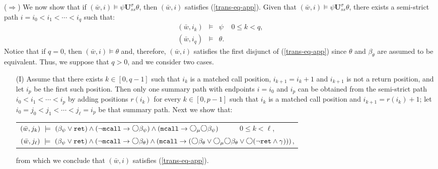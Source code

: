 \documentclass{LMCS}
\newcommand{\M}{{\mu}}
\newcommand{\w}{{\bar{w}}}
\newcommand{\dm}{\Diamond}
\newcommand{\U}{{\mathbf U}}
\newcommand{\next}{\text{\raisebox{1pt}{$\bigcirc$}}}
\theoremstyle{plain}
\theoremstyle{definition}
\newcommand{\ppath}{\sigma} \newcommand{\Ul}{\U}
\newcommand{\Up}{\U^\ppath}
\newcommand{\Uss}{\Up_{ss}}
\newcommand{\mcall}{{\tt{mcall}}}
\newcommand{\rett}{{\tt ret}}
\newcommand{\dmm}{\dm_{\M}}
\renewcommand{\dm}{\next}
\renewcommand{\dmm}{\dm_\M}
\begin{document}
\noindent
($\Rightarrow$) We now show that if $(\w, i) \models \psi \Uss
\theta$, then  $(\w, i)$ satisfies (\ref{trans-eq-app}). Given that $(\w,
i) \models \psi \Uss \theta$, there exists a semi-strict path
$i = i_0 < i_1 < \cdots < i_q$ such that: 
\begin{eqnarray}
\label{m-eq1}
(\w, i_k) & \models & \psi \ \ \ \ \ 0 \leq k < q,\\
\label{m-eq2}
(\w, i_q) & \models & \theta.
\end{eqnarray}
Notice that if $q = 0$, then $(\w, i) \models \theta$ and, therefore,
$(\w, i)$ satisfies the first disjunct of (\ref{trans-eq-app}) since
$\theta$ and $\beta_\theta$ are assumed to be equivalent. Thus, we
suppose that $q > 0$, and we consider two cases.
\begin{enumerate}[(a)]
\item[(I)] Assume that there exists $k \in [0,q-1]$ such that $i_k$
is a matched call position, $i_{k+1} = i_k+1$ and $i_{k+1}$ is not a
return position, and let $i_p$ be the first such position. Then only
one summary path with endpoints $i = i_0$ and $i_p$ can be obtained
from the semi-strict path $i_0 < i_1 < \cdots < i_p$ by adding
positions $r(i_k)$ for every $k \in [0,p-1]$ such that $i_k$ is a
matched call position and $i_{k+1} = r(i_k)+1$; let $i_0 = j_0 < j_1 <
\cdots < j_\ell = i_p$ be that summary path. Next we show that:
\begin{center}
{\small
\begin{tabular}{l}
$(\w, j_k) \ \models \ (\beta_\psi \vee \rett) \wedge (\neg \mcall
\to \dm \beta_\psi) \wedge (\mcall \to \dmm \dm \beta_\psi)$ \ \ \ \ \
$0 \leq k < \ell$,\\ 
$(\w, j_{\ell}) \ \models \  (\beta_\psi \vee \rett) \wedge (\neg \mcall \to
\dm \beta_\theta) \wedge (\mcall \to (\dm \beta_\theta \vee \dmm \dm
\beta_\theta \vee \dm (\neg \rett \wedge \gamma)))$,
\end{tabular}}
\end{center}
from which we conclude that $(\w, i)$ satisfies (\ref{trans-eq-app}).


\end{enumerate}
\end{document}
